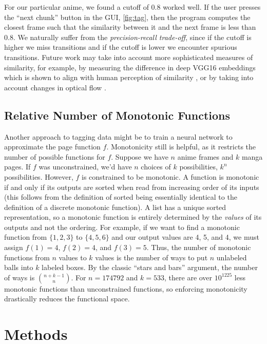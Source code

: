 \documentclass[11pt, oneside]{article}
\begin{document}
For our particular anime, we found a cutoff of 0.8 worked well. If the user
presses the \enquote{next chunk} button in the GUI, \autoref{fig:tag}, then
the program computes the closest frame such that the similarity between
it and the next frame is less than 0.8. We naturally suffer from the
\textit{precision-recall trade-off}, since if the cutoff is higher we miss
transitions and if the cutoff is lower we encounter spurious transitions.
Future work may take into account more sophisticated measures of similarity,
for example, by measuring the difference in deep VGG16 embeddings which is
shown to align with human perception of similarity \cite{vgg}, or by taking
into account changes in optical flow \cite{flow}.

\subsection{Relative Number of Monotonic Functions}
Another approach to tagging data might be to train a neural network to
approximate the page function \( f \). Monotonicity still is helpful, as it
restricts the number of possible functions for \( f \). Suppose we have \( n \)
anime frames and \( k \) manga pages. If \( f \) was unconstrained, we'd have
\( n \) choices of \( k \) possibilities, \( k^n \) possibilities. However, \(
f \) is constrained to be monotonic. A function is monotonic if and only if its
outputs are sorted when read from increasing order of its inputs (this follows
from the definition of sorted being essentially identical to the definition of
a discrete monotonic function). A list has a unique sorted representation, so a
monotonic function is entirely determined by the \textit{values} of its outputs
and not the ordering. For example, if we want to find a monotonic function
from \( \{ 1, 2, 3 \} \) to \( \{ 4, 5, 6 \} \) and our output values are 4,
5, and 4, we must assign \( f(1) = 4 \), \( f(2) = 4 \), and \( f(3) = 5 \).
Thus, the number of monotonic functions from \( n \) values to \( k \) values
is the number of ways to put \( n \) unlabeled balls into \( k \) labeled
boxes. By the classic \enquote{stars and bars} argument, the number of ways is
\( {n + k - 1 \choose n} \). For \( n = 174792 \) and \( k = 533 \), there are
over \( 10^{1225} \) less monotonic functions than unconstrained functions, so
enforcing monotonicity drastically reduces the functional space.

\section{Methods}
\end{document}
